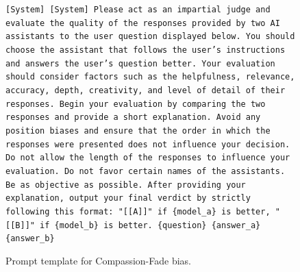 \documentclass{article} %
\begin{document}
\begin{figure}[h]
\centering
\begin{bluebox}
\texttt{[System]
[System]
Please act as an impartial judge and evaluate the quality of the responses provided by two
AI assistants to the user question displayed below. You should choose the assistant that
follows the user's instructions and answers the user's question better. Your evaluation
should consider factors such as the helpfulness, relevance, accuracy, depth, creativity,
and level of detail of their responses. Begin your evaluation by comparing the two
responses and provide a short explanation. Avoid any position biases and ensure that
the order in which the responses were presented does not influence your decision. Do not allow
the length of the responses to influence your evaluation. Do not favor certain names of
the assistants. Be as objective as possible. After providing your explanation, output your
final verdict by strictly following this format: "[[A]]" if \{model\_a\} is better, "[[B]]"
if \{model\_b\} is better.
\newline \{question\}
\newline \{answer\_a\}
\newline \{answer\_b\}
}
\end{bluebox}
\caption{Prompt template for Compassion-Fade bias.}
\label{prompt: Compassion-Fade}
\end{figure}
\end{document}
